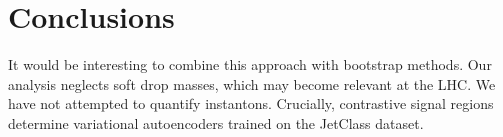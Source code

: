 \section{Conclusions}\label{sec:conclusions}

It would be interesting to combine this approach with bootstrap methods.
Our analysis neglects soft drop masses, which may become relevant at the
LHC. We have not attempted to quantify instantons. Crucially,
contrastive signal regions determine variational autoencoders trained on
the JetClass dataset.

